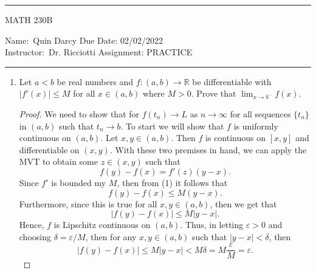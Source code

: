 \documentclass[12pt]{article}
\begin{document}
    \thispagestyle{empty}\hrule

    \begin{center}
        \vspace{.4cm} { \large MATH 230B}
    \end{center}
    {Name:\ Quin Darcy \hspace{\fill} Due Date: 02/02/2022   \\
    { Instructor:}\ Dr. Ricciotti \hspace{\fill} Assignment:
    PRACTICE \\ \hrule}

    \begin{enumerate}
        \item Let $a<b$ be real numbers and $f:(a, b)\to\mathbb{R}$ be
            differentiable with $|f'(x)|\leq M$ for all $x\in(a, b)$ where
            $M>0$. Prove that $\lim_{x\to b^{-}}f(x)$.
            \begin{proof}
                We need to show that for $f(t_n)\to L$ as $n\to\infty$ for all
                sequences $\{t_n\}$ in $(a, b)$ such that $t_n\to b$. To start
                we will show that $f$ is uniformly continuous on $(a, b)$. Let
                $x, y\in (a, b)$. Then $f$ is continuous on $[x, y]$ and
                differentiable on $(x, y)$. With these two premises in hand, we
                can apply the MVT to obtain some $z\in (x, y)$ such that 
                \begin{equation}
                    f(y)-f(x)=f'(z)(y-x).
                \end{equation}
                Since $f'$ is bounded my $M$, then from (1) it follows that 
                \begin{equation}
                    f(y)-f(x)\leq M(y-x).
                \end{equation}
                Furthermore, since this is true for all $x, y\in(a, b)$, then
                we get that 
                \begin{equation}
                    |f(y)-f(x)|\leq M|y-x|.
                \end{equation}
                Hence, $f$ is Lipschitz continuous on $(a, b)$. Thus, in
                letting $\varepsilon>0$ and choosing $\delta=\varepsilon/M$,
                then for any $x, y\in(a, b)$ such that $|y-x|<\delta$, then 
                \begin{equation}
                    |f(y)-f(x)|\leq M|y-x|<M\delta=M\frac{\varepsilon}{M}=\varepsilon.
                \end{equation}

\end{proof}
\end{enumerate}
\end{document}
